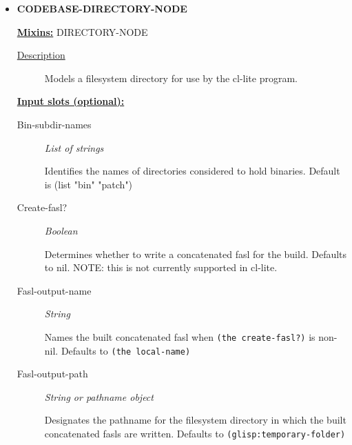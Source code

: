 \documentclass [11pt]{book}
\begin{document}
\begin{itemize}

\item {}
\label{prim:codebase-directory-node}
\textbf{CODEBASE-DIRECTORY-NODE}


\textbf{
\underline{Mixins:}} DIRECTORY-NODE





\begin{description}

\item [
\underline{Description}]


Models a filesystem directory for use by the cl-lite program.



\end{description}








\textbf{
\underline{Input slots (optional):}}

\begin{description}

\item [Bin-subdir-names]
\emph{List of strings}

 Identifies the names of directories considered to hold binaries.
Default is (list "bin" "patch")




\item [Create-fasl?]
\emph{Boolean}

 Determines whether to write a concatenated fasl for the build. Defaults to nil.
NOTE: this is not currently supported in cl-lite.




\item [Fasl-output-name]
\emph{String}

 Names the built concatenated fasl when \texttt{(the create-fasl?)} is non-nil.
Defaults to \texttt{(the local-name)}




\item [Fasl-output-path]
\emph{String or pathname object}

 Designates the pathname for the filesystem directory in which
the built concatenated fasls are written. Defaults to \texttt{(glisp:temporary-folder)}





\end{description}
\end{itemize}
\end{document}
